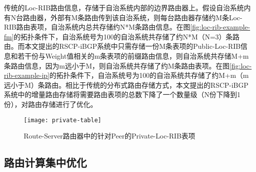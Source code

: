 

传统的Loc-RIB路由信息，存储于自治系统内部的边界路由器上。假设自治系统内有N台路由器，外部有M条路由传到该自治系统，则每台路由器存储约M条Loc-RIB路由表项，自治系统内总共存储约N*M条路由信息。在图\ref{fig:loc-rib-example-fm}的拓扑条件下，自治系统号为100的自治系统共存储了约N*M（N=3）条路由。而本文提出的RSCP-iBGP系统中只需存储一份M条表项的Public-Loc-RIB信息和若干份与Weight值相关的m条表项的前缀路由信息，则自治系统共存储M+m条路由信息，因为m远小于M，则自治系统共存储了约M条路由表项。在图\ref{fig:loc-rib-example-ip}的拓扑条件下，自治系统号为100的自治系统共存储了约M+m（m远小于M）条路由。相比于传统的分布式路由存储方式，本文提出的RSCP-iBGP系统中的增量路由存储将需要路由表项的总数下降了一个数量级（N份下降到1份），对路由存储进行了优化。

\begin{figure}
  \centering
  \texttt{[image: private-table]}
  \caption{Route-Server路由器中的针对Peer的Private-Loc-RIB表项}
  \label{fig:private-table}
\end{figure}

\subsection{路由计算集中优化}

